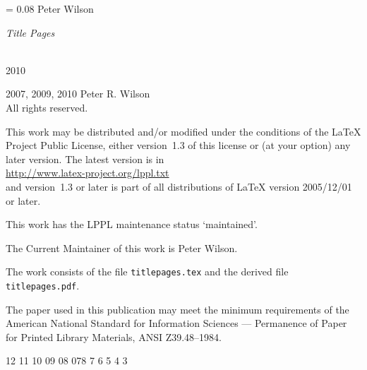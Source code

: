 \documentclass{memoir}
\newlength{\drop}
\newcommand*{\thistitle}{\begingroup%
\parindent=0pt
\drop = 0.08\textheight
\vspace*{\drop}
\hspace*{0.3\textwidth}%
{\LARGE Peter Wilson}\\[2\drop]
\hspace*{0.3\textwidth}{\HUGE\itshape Some Examples of}\par
{\raggedleft\HUGE\itshape Title Pages\par}
\vfill
\settowidth{\bibindent}{\Large The Herries Press}%
\settowidth{\unitlength}{\Large 2006}%
\addtolength{\bibindent}{-\unitlength}%
\hspace*{0.3\textwidth}{\Large The Herries Press}\\[0.5\baselineskip]
\hspace*{0.3\textwidth}%
{\Large 2010}
\vspace*{\drop}
\endgroup}
\begin{document}
\raggedbottom

\frontmatter
\pagestyle{empty}
\thistitle
\clearpage

\begingroup
\footnotesize
\parindent 0pt
\parskip \baselineskip
\textcopyright{} 2007, 2009, 2010 Peter R. Wilson \\
All rights reserved.

This work may be distributed and/or modified under the conditions
of the LaTeX Project Public License, either version~1.3 of this license
or (at your option) any later version. The latest version is in \\
\hspace*{2em} \url{http://www.latex-project.org/lppl.txt} \\
and version~1.3 or later is part of all distributions of LaTeX
version 2005/12/01 or later.

This work has the LPPL maintenance status `maintained'.

The Current Maintainer of this work is Peter Wilson.

The work consists of the file \texttt{titlepages.tex} and the
derived file \texttt{titlepages.pdf}.

\begin{comment}
This material may be distributed only subject to the terms and conditions
set forth in the Open Publication License v1.0 or later (the latest
version is presently available at \url{http://www.opencontent.org/openpub/}).
Distribution of substantively modified versions of this document is
prohibited without the explicit permission of the copyright holder.
Distribution of the work or derivative of the work in any standard
(paper) book form is prohibited unless prior permission is obtained
from the copyright holder.


The procedures and applications presented in this work have been
included for their instructional value. They have been tested
with care but are not guaranteed for any particular purpose.
The publisher does not offer any warranties or representations,
nor does it accept any liabilities with respect to the
programs or applications.
\end{comment}

The paper used in this publication may meet the minimum
requirements of the American National Standard for
Information Sciences --- Permanence of Paper for Printed
Library Materials, ANSI Z39.48--1984.

\begin{center}
  12 11 10 09 08 07\hspace{2em}8 7 6 5 4 3 %
\end{center}
\end{document}
